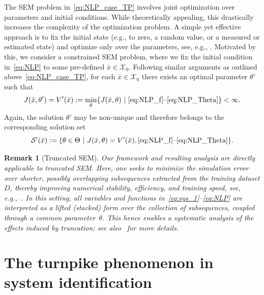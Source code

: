 \documentclass[a4paper,fleqn]{cas-dc}
\newtheorem{rem}{Remark}
\begin{document}
The SEM problem in~\eqref{eq:NLP_case_TP} involves joint optimization over parameters and initial conditions. While theoretically appealing, this drastically increases the complexity of the optimization problem. A simple yet effective approach is to fix the initial state (e.g., to zero, a random value, or a measured or estimated state) and optimize only over the parameters, see, e.g., \cite{Xu2023a,AllenZhu2019,Schiller2025b,Jaeger2002,Bonassi2022,Mohajerin2019,Masti2021,Beintema2023a,Beintema2023,Forgione2022}.
{Motivated by this, we consider a constrained SEM problem, where we fix the initial condition in~\eqref{eq:NLP} to some pre-defined $\bar{x}\in\mathcal{X}_0$.}
Following similar arguments as outlined above~\eqref{eq:NLP_case_TP}, for each $\bar{x}\in\mathcal{X}_0$ there exists an optimal parameter $\theta'$ such that
\begin{equation}\label{eq:NLP_case_1}
	J(\bar{x},\theta') = V'(\bar{x}) := \min_{\theta}\{ J(\bar{x},\theta)\ |\  \text{\eqref{eq:NLP_f}--\eqref{eq:NLP_Theta}}\} < \infty.
\end{equation}
Again, the solution $\theta'$ may be non-unique and therefore belongs to the corresponding solution set
\begin{equation}\label{eq:S_prime}
	\mathcal{S}'(\bar{x}):=\{\theta\in\Theta \ | \ J(\bar{x},\theta) = V'(\bar{x}), \text{\eqref{eq:NLP_f}--\eqref{eq:NLP_Theta}}\}.
\end{equation}

\begin{rem}[Truncated SEM]
	Our framework and resulting analysis are directly applicable to truncated SEM. Here, one seeks to minimize the simulation error over shorter, possibly overlapping subsequences extracted from the training dataset $D$, thereby improving numerical stability, efficiency, and training speed, see, e.g.,~\cite{Bonassi2022,Jaeger2002,Schiller2025b,Mohajerin2019,Forgione2022}.
	In this setting, all variables and functions in~\eqref{eq:sys_1}--\eqref{eq:NLP} are interpreted as a lifted (stacked) form over the collection of subsequences, coupled through a common parameter~$\theta$. This hence enables a systematic analysis of the effects induced by truncation; see also~\cite{Schiller2025b} for more details.
\end{rem}

\section{The turnpike phenomenon in system identification}\label{sec:main_results}
\end{document}
